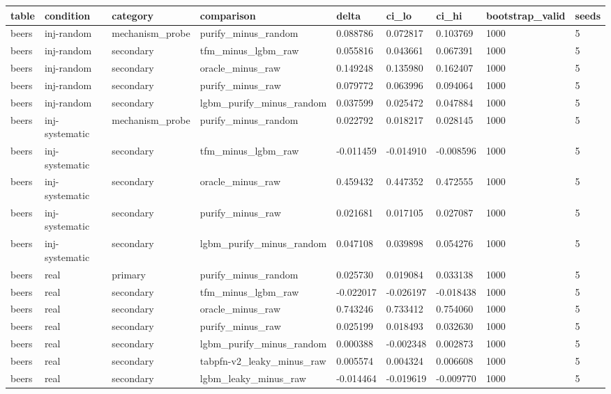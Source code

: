 \begin{tabular}{lllllllll}
\hline
table & condition & category & comparison & delta & ci\_lo & ci\_hi & bootstrap\_valid & seeds \\
\hline
beers & inj-random & mechanism\_probe & purify\_minus\_random & 0.088786 & 0.072817 & 0.103769 & 1000 & 5 \\
beers & inj-random & secondary & tfm\_minus\_lgbm\_raw & 0.055816 & 0.043661 & 0.067391 & 1000 & 5 \\
beers & inj-random & secondary & oracle\_minus\_raw & 0.149248 & 0.135980 & 0.162407 & 1000 & 5 \\
beers & inj-random & secondary & purify\_minus\_raw & 0.079772 & 0.063996 & 0.094064 & 1000 & 5 \\
beers & inj-random & secondary & lgbm\_purify\_minus\_random & 0.037599 & 0.025472 & 0.047884 & 1000 & 5 \\
beers & inj-systematic & mechanism\_probe & purify\_minus\_random & 0.022792 & 0.018217 & 0.028145 & 1000 & 5 \\
beers & inj-systematic & secondary & tfm\_minus\_lgbm\_raw & -0.011459 & -0.014910 & -0.008596 & 1000 & 5 \\
beers & inj-systematic & secondary & oracle\_minus\_raw & 0.459432 & 0.447352 & 0.472555 & 1000 & 5 \\
beers & inj-systematic & secondary & purify\_minus\_raw & 0.021681 & 0.017105 & 0.027087 & 1000 & 5 \\
beers & inj-systematic & secondary & lgbm\_purify\_minus\_random & 0.047108 & 0.039898 & 0.054276 & 1000 & 5 \\
beers & real & primary & purify\_minus\_random & 0.025730 & 0.019084 & 0.033138 & 1000 & 5 \\
beers & real & secondary & tfm\_minus\_lgbm\_raw & -0.022017 & -0.026197 & -0.018438 & 1000 & 5 \\
beers & real & secondary & oracle\_minus\_raw & 0.743246 & 0.733412 & 0.754060 & 1000 & 5 \\
beers & real & secondary & purify\_minus\_raw & 0.025199 & 0.018493 & 0.032630 & 1000 & 5 \\
beers & real & secondary & lgbm\_purify\_minus\_random & 0.000388 & -0.002348 & 0.002873 & 1000 & 5 \\
beers & real & secondary & tabpfn-v2\_leaky\_minus\_raw & 0.005574 & 0.004324 & 0.006608 & 1000 & 5 \\
beers & real & secondary & lgbm\_leaky\_minus\_raw & -0.014464 & -0.019619 & -0.009770 & 1000 & 5 \\

\end{tabular}
